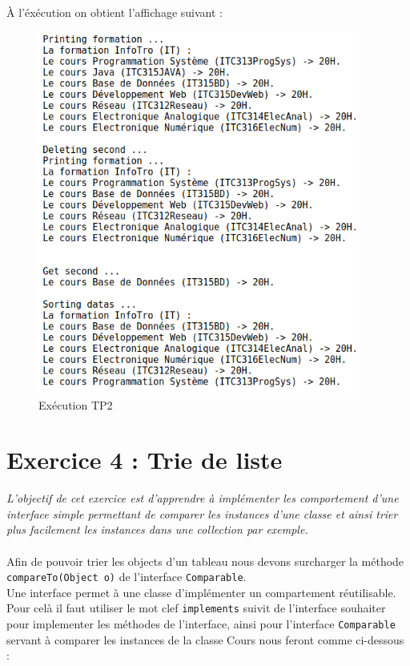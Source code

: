 À l'éxécution on obtient l'affichage suivant :
\begin{figure}[H]
  \centering
  \includegraphics[width=300pt]{./tp/Pictures/tp2-execute}
  \caption{Exécution TP2}
  \label{Exécution TP2}
\end{figure}

\section{Exercice 4 : Trie de liste}
\textit{L'objectif de cet exercice est d'apprendre à implémenter les comportement d'une interface simple permettant de comparer les instances d'une classe et ainsi trier plus facilement les instances dans une collection par exemple.}
\\\\
Afin de pouvoir trier les objects d'un tableau nous devons surcharger la méthode \texttt{compareTo(Object o)} de l'interface \texttt{Comparable}.\\
Une interface permet à une classe d'implémenter un compartement réutilisable. Pour celà il faut utiliser le mot clef \texttt{implements} suivit de l'interface souhaiter pour implementer les méthodes de l'interface, ainsi pour l'interface \texttt{Comparable} servant à comparer les instances de la classe Cours nous feront comme ci-dessous :
\inputminted[linenos,firstline=3,lastline=3]{java}{../sources/src/tp2/Cours.java}

